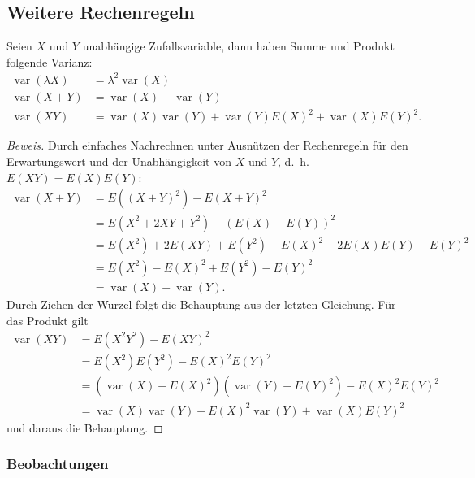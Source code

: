 \subsection{Weitere Rechenregeln}
\begin{satz}
\label{rechenregeln-varianz}
Seien $X$ und $Y$ unabhängige Zufallsvariable, dann haben
Summe und Produkt folgende Varianz:
\begin{align*}
\operatorname{var}(\lambda X)&=\lambda^2\operatorname{var}(X)\\
\operatorname{var}(X+Y)&=\operatorname{var}(X)+\operatorname{var}(Y)\\
\operatorname{var}(XY)&=\operatorname{var}(X)\operatorname{var}(Y)
+
\operatorname{var}(Y)E(X)^2+\operatorname{var}(X)E(Y)^2.
\end{align*}
\end{satz}
\begin{proof}[Beweis]Durch einfaches Nachrechnen unter Ausnützen der
Rechenregeln für den Erwartungswert und der
Unabhängigkeit von $X$ und $Y$, d.~h.~$E(XY)=E(X)E(Y)$:
\begin{align*}
\operatorname{var}(X+Y)
&=E((X+Y)^2)-E(X+Y)^2\\
&=E(X^2+2XY+Y^2)-(E(X)+E(Y))^2\\
&=E(X^2)+2E(XY)+E(Y^2)-E(X)^2-2E(X)E(Y)-E(Y)^2\\
&=E(X^2)-E(X)^2+E(Y^2)-E(Y)^2\\
&=\operatorname{var}(X)+\operatorname{var}(Y).
\end{align*}
Durch Ziehen der Wurzel folgt die Behauptung aus der letzten Gleichung.
Für das Produkt gilt
\begin{align*}
\operatorname{var}(XY)
&=E(X^2Y^2)-E(XY)^2\\
&=E(X^2)E(Y^2)-E(X)^2E(Y)^2\\
&=(\operatorname{var}(X)+E(X)^2)(\operatorname{var}(Y)+E(Y)^2)
-E(X)^2E(Y)^2\\
&=\operatorname{var}(X)\operatorname{var}(Y)+E(X)^2\operatorname{var}(Y)
+\operatorname{var}(X)E(Y)^2
\end{align*}
und daraus die Behauptung.
\end{proof}

\subsubsection{Beobachtungen}

